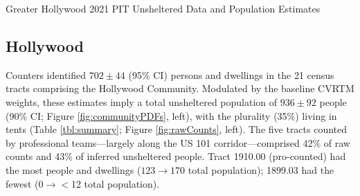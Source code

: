 \documentclass[11pt,twocolumn]{article}
\begin{document}

\begin{table}[t!]
\caption{Greater Hollywood 2021 PIT Unsheltered Data and Population Estimates}
\caption*{Parentheses denote 90\% uncertainties (binomial in the case of the categories). 
Uncertainties larger than estimates imply that only upper limits are available. Marginalized
upper limits are obtainable from the results file and imply $<$3 unaccompanied minors and
$<$3 unsheltered families in either community.}
\label{tbl:summary}
\end{table}


\subsection{Hollywood}
\label{sec:hWood}

Counters identified $702\pm44$ (95\% CI) persons and dwellings in the 21 census tracts 
comprising the Hollywood Community. Modulated by the baseline CVRTM weights, these 
estimates imply a total unsheltered population of $936\pm92$ people 
(90\% CI; Figure \ref{fig:communityPDFs}, left), with the plurality (35\%) living in tents 
(Table \ref{tbl:summary}; Figure \ref{fig:rawCounts}, left). The five tracts counted by professional 
teams---largely along the US 101 corridor---comprised 42\% of raw counts and 43\% of inferred 
unsheltered people. Tract 1910.00 (pro-counted) had the most people and dwellings ($123\rightarrow170$
total population); 1899.03 had the fewest ($0\rightarrow$$<$12 total population). %
\end{document}
